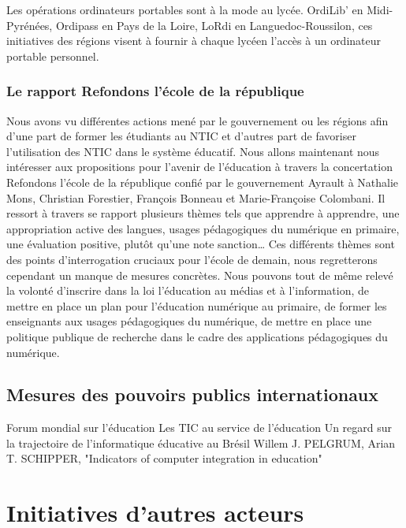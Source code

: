 Les opérations \og{}ordinateurs portables\fg{} sont à la mode au lycée. OrdiLib' en Midi-Pyrénées, Ordipass en Pays de la Loire, LoRdi en Languedoc-Roussilon, ces initiatives des régions visent à fournir à chaque lycéen l'accès à un ordinateur portable personnel.

\cite{portables35}
\cite{portables60}
\cite{portables40}


\subsection{Le rapport \og{}Refondons l'école de la république\fg{}}

Nous avons vu différentes actions mené par le gouvernement ou les régions afin d'une part de former les étudiants au NTIC et d'autres part de favoriser l'utilisation des NTIC dans le système éducatif. Nous allons maintenant nous intéresser aux propositions pour l'avenir de l'éducation à travers la concertation \og{}Refondons l'école de la république\fg{} confié par le gouvernement Ayrault à Nathalie Mons, Christian Forestier, François Bonneau et Marie-Françoise Colombani. Il ressort à travers se rapport plusieurs thèmes tels que \og{}apprendre à apprendre\fg{}, \og{}une appropriation active des langues\fg{}, \og{}usages pédagogiques du numérique en primaire\fg{}, \og{}une évaluation positive, plutôt qu'une note sanction\fg{}… Ces différents thèmes sont des points d'interrogation cruciaux pour l'école de demain, nous regretterons cependant un manque de mesures concrètes. Nous pouvons tout de même relevé la volonté d'inscrire dans la loi \og l'éducation au médias et à l'information\fg{}, de mettre en place un plan pour l'éducation numérique au primaire, de former les enseignants aux usages pédagogiques du numérique, de mettre en place une politique publique de recherche dans le cadre des applications pédagogiques du numérique.

\section{Mesures des pouvoirs publics internationaux}
Forum mondial sur l’éducation \cite{educ_forum}
Les TIC au service de l’éducation \cite{tics}
Un regard sur la trajectoire de l’informatique éducative au Brésil \cite{peixoto2006regard}
Willem J. PELGRUM, Arian T. SCHIPPER, "Indicators of computer integration in education" \cite{pelgrum1993indicators}


\chapter{Initiatives d'autres acteurs}
\label{sec:initialivesautres}

